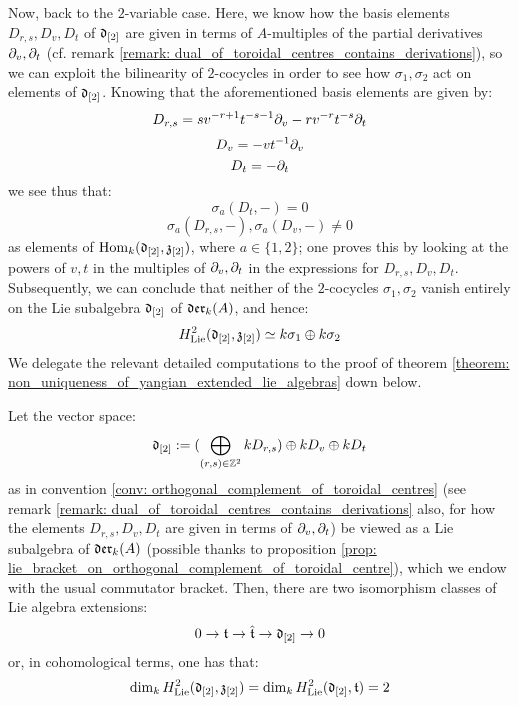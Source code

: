 \begin{remark}
            Now, back to the $2$-variable case. Here, we know how the basis elements $D_{r, s}, D_v, D_t$ of $\mathfrak{d}_{[2]}$ are given in terms of $A$-multiples of the partial derivatives $\partial_v, \partial_t$ (cf. remark \ref{remark: dual_of_toroidal_centres_contains_derivations}), so we can exploit the bilinearity of $2$-cocycles in order to see how $\sigma_1, \sigma_2$ act on elements of $\mathfrak{d}_{[2]}$. Knowing that the aforementioned basis elements are given by:
                $$D_{r, s} = s v^{-r + 1} t^{-s - 1} \partial_v - r v^{-r} t^{-s} \partial_t$$
                $$D_v = -v t^{-1} \partial_v$$
                $$D_t = -\partial_t$$
            we see thus that:
                $$\sigma_a(D_t, -) = 0$$
                $$\sigma_a(D_{r, s}, -), \sigma_a(D_v, -) \not = 0$$
            as elements of $\mathrm{Hom}_{k}(\mathfrak{d}_{[2]}, \mathfrak{z}_{[2]})$, where $a \in \{1, 2\}$; one proves this by looking at the powers of $v, t$ in the multiples of $\partial_v, \partial_t$ in the expressions for $D_{r, s}, D_v, D_t$. Subsequently, we can conclude that neither of the $2$-cocycles $\sigma_1, \sigma_2$ vanish entirely on the Lie subalgebra $\mathfrak{d}_{[2]}$ of $\mathfrak{der}_{k}(A)$, and hence:
                $$H^2_{\mathrm{Lie}}(\mathfrak{d}_{[2]}, \mathfrak{z}_{[2]}) \simeq k \sigma_1 \oplus k \sigma_2$$
            We delegate the relevant detailed computations to the proof of theorem \ref{theorem: non_uniqueness_of_yangian_extended_lie_algebras} down below.  
        \end{remark}
        \begin{theorem} \label{theorem: non_uniqueness_of_yangian_extended_lie_algebras}
            Let the vector space:
                $$\mathfrak{d}_{[2]} := (\bigoplus_{(r, s) \in \mathbb{Z}^2} k D_{r, s}) \oplus k D_v \oplus k D_t$$
            as in convention \ref{conv: orthogonal_complement_of_toroidal_centres} (see remark \ref{remark: dual_of_toroidal_centres_contains_derivations} also, for how the elements $D_{r, s}, D_v, D_t$ are given in terms of $\partial_v, \partial_t$) be viewed as a Lie subalgebra of $\mathfrak{der}_{k}(A)$ (possible thanks to proposition \ref{prop: lie_bracket_on_orthogonal_complement_of_toroidal_centre}), which we endow with the usual commutator bracket. Then, there are two isomorphism classes of Lie algebra extensions:
                $$0 \to \mathfrak{t} \to \hat{\mathfrak{t}} \to \mathfrak{d}_{[2]} \to 0$$
            or, in cohomological terms, one has that:
                $$\dim_{k} H^2_{\mathrm{Lie}}(\mathfrak{d}_{[2]}, \mathfrak{z}_{[2]}) = \dim_{k} H^2_{\mathrm{Lie}}(\mathfrak{d}_{[2]}, \mathfrak{t}) = 2$$
        \end{theorem}
